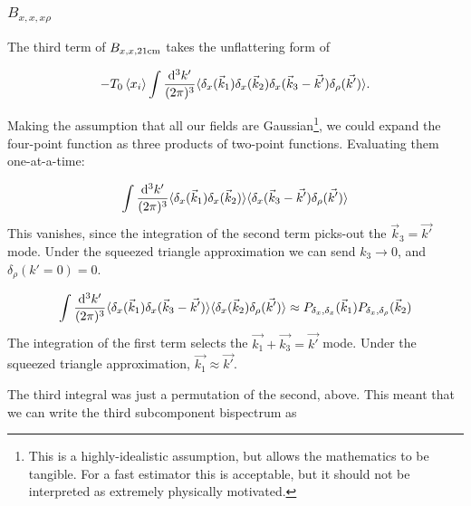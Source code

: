 \subsubsection*{$B_{x,x,x\rho}$}
\label{subsubsec:B_xxxrho}
The third term of $B_{x,x,{\rm 21cm}}$ takes the unflattering form of

\begin{equation}
- T_0 \left\langle x_i \right\rangle \int \frac{{\rm d^3}k'}{(2\pi)^3} 
\langle \delta_x(\vec{k}_1) \delta_x(\vec{k}_2) \delta_x(\vec{k}_3 - \vec{k'})\delta_{\rho}(\vec{k'}) \rangle .
\end{equation}

Making the assumption that all our fields are Gaussian\footnote{This is a highly-idealistic assumption, but allows the mathematics to be tangible. For a fast estimator this is acceptable, but it should not be interpreted as extremely physically motivated.}, we could expand the four-point function as three products of two-point functions. Evaluating them one-at-a-time:

\begin{equation}
\int \frac{{\rm d^3}k'}{(2\pi)^3} \langle \delta_x(\vec{k}_1) \delta_x(\vec{k}_2) \rangle \langle \delta_x(\vec{k}_3 - \vec{k'})\delta_{\rho}(\vec{k'}) \rangle
\end{equation}
This vanishes, since the integration of the second term picks-out the $\vec{k}_3 = \vec{k'}$ mode. Under the squeezed triangle approximation we can send $k_3 \rightarrow 0$, and $\delta_{\rho}(k'=0)=0$.

\begin{equation}
\int \frac{{\rm d^3}k'}{(2\pi)^3} \langle \delta_x(\vec{k}_1)\delta_x(\vec{k}_3 - \vec{k'}) \rangle \langle \delta_x(\vec{k}_2) \delta_{\rho}(\vec{k'}) \rangle \approx P_{\delta_x, \delta_x}(\vec{k}_1) P_{\delta_x, \delta_{\rho}}(\vec{k}_2) 
\end{equation}
The integration of the first term selects the $\vec{k_1} + \vec{k_3} = \vec{k'}$ mode. Under the squeezed triangle approximation, $\vec{k_1} \approx \vec{k'}$.

The third integral was just a permutation of the second, above. This meant that we can write the third subcomponent bispectrum as

